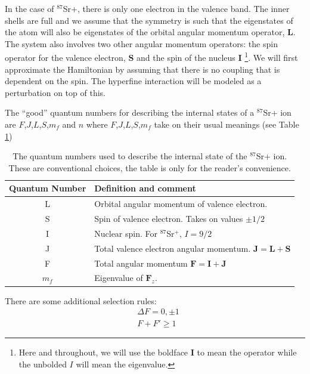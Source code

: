 In the case of $^{87}$Sr+, there is only one electron in the valence band. The inner shells are full and we assume that the symmetry is such that the eigenstates of the atom will also be eigenstates of the orbital angular momentum operator, $\mathbf{L}$.
 The system also involves two other angular momentum operators: the spin operator for the valence electron, $\mathbf{S}$%
and the spin of the nucleus $\mathbf{I}$ \footnote{Here and throughout, we will use the boldface $\mathbf{I}$ to mean the operator while the unbolded $I$ will mean the eigenvalue.}.
We will first approximate the Hamiltonian by assuming that there is no coupling that is dependent on the spin. 
The hyperfine interaction will be modeled as a perturbation on top of this.

The ``good'' quantum numbers for describing the internal states of a $^{87}$Sr+ ion are $F$,$J$,$L$,$S$,$m_f$ and $n$\cite{experimental_hyperfine_alkali_arimondo}\cite{cuaMITnotes} where $F$,$J$,$L$,$S$,$m_f$ take on their usual meanings (see Table\,\ref{quantumNumberQuickref})

\begin{table}[h!]
\centering
\begin{tabular}{|c|l|}
\hline
Quantum Number & Definition and comment \\ \hline \hline
L & Orbital angular momentum of valence electron. \\ \hline
S & Spin of valence electron. Takes on values $\pm 1/2$ \\ \hline
I & Nuclear spin. For $^{87}$Sr$^+$, $I=9/2$ \\ \hline
J & Total valence electron angular momentum. $\mathbf{J}=\mathbf{L}+\mathbf{S}$ \\ \hline
F & Total angular momentum $\mathbf{F}=\mathbf{I}+\mathbf{J}$ \\ \hline
$m_f$ & Eigenvalue of $\mathbf{F}_z$.\\ \hline
\end{tabular}
\caption{The quantum numbers used to describe the internal state of the $^{87}$Sr+ ion. These are conventional choices, the table is only for the reader's convenience.}
\label{quantumNumberQuickref}
\end{table}

There are some additional selection rules\cite{sobelman_spectra}:
\begin{align}
&\Delta F=0,\pm 1\\
&F+F'\geq 1
\label{FselectionRules}
\end{align}

